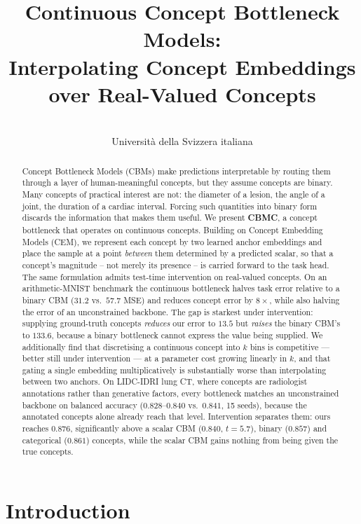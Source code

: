 \documentclass[11pt]{article}
\title{Continuous Concept Bottleneck Models:\\
       Interpolating Concept Embeddings over Real-Valued Concepts}
\author{\todo{authors} \\ Universit\`a della Svizzera italiana}
\date{}
\begin{document}
\maketitle

\begin{abstract}
Concept Bottleneck Models (CBMs) make predictions interpretable by routing them
through a layer of human-meaningful concepts, but they assume concepts are
binary. Many concepts of practical interest are not: the diameter of a lesion,
the angle of a joint, the duration of a cardiac interval. Forcing such
quantities into binary form discards the information that makes them useful.
We present \textbf{CBMC}, a concept bottleneck that operates on continuous
concepts. Building on Concept Embedding Models (CEM), we represent each concept
by two learned anchor embeddings and place the sample at a point \emph{between}
them determined by a predicted scalar, so that a concept's magnitude -- not
merely its presence -- is carried forward to the task head. The same
formulation admits test-time intervention on real-valued concepts.
On an arithmetic-MNIST benchmark the continuous bottleneck halves task error
relative to a binary CBM ($31.2$ vs.\ $57.7$ MSE) and reduces concept error by
$8\times$, while also halving the error of an unconstrained backbone. The gap
is starkest under intervention: supplying ground-truth concepts \emph{reduces}
our error to $13.5$ but \emph{raises} the binary CBM's to $133.6$, because a binary
bottleneck cannot express the value being supplied. We additionally find that
discretising a continuous concept into $k$ bins is competitive --- better still
under intervention --- at a parameter cost growing linearly in $k$, and that
gating a single embedding multiplicatively is substantially worse than
interpolating between two anchors. On LIDC-IDRI lung CT, where concepts are
radiologist annotations rather than generative factors, every bottleneck
matches an unconstrained backbone on balanced accuracy ($0.828$--$0.840$ vs.\
$0.841$, 15 seeds), because the annotated concepts alone already reach that
level. Intervention separates them: ours reaches $0.876$, significantly above a
scalar CBM ($0.840$, $t = 5.7$), binary ($0.857$) and categorical ($0.861$)
concepts, while the scalar CBM gains nothing from being given the true
concepts.
\end{abstract}

\section{Introduction}
\label{sec:intro}
\end{document}

